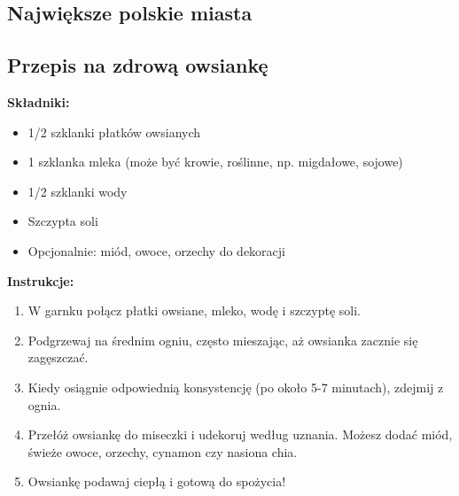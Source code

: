 \newpage

\subsection{Największe polskie miasta}
\vspace{0,2cm}

 
\vspace{0,2cm}

\subsection{Przepis na zdrową owsiankę}
\vspace{0,5cm}
\textbf{Składniki:}
    \begin{itemize}
        \item 1/2 szklanki płatków owsianych
        \item 1 szklanka mleka (może być krowie, roślinne, np. migdałowe, sojowe)
        \item 1/2 szklanki wody
        \item Szczypta soli
        \item Opcjonalnie: miód, owoce, orzechy do dekoracji
    \end{itemize}
\vspace{0,5cm}

\textbf{Instrukcje:}
\begin{enumerate}
    \item W garnku połącz płatki owsiane, mleko, wodę i szczyptę soli.
    \item Podgrzewaj na średnim ogniu, często mieszając, aż owsianka zacznie się zagęszczać.
    \item Kiedy osiągnie odpowiednią konsystencję (po około 5-7 minutach), zdejmij z ognia.
    \item Przełóż owsiankę do miseczki i udekoruj według uznania. Możesz dodać miód, świeże owoce, orzechy, cynamon czy nasiona chia.
    \item Owsiankę podawaj ciepłą i gotową do spożycia!
\end{enumerate}
\vspace{0.5cm}



